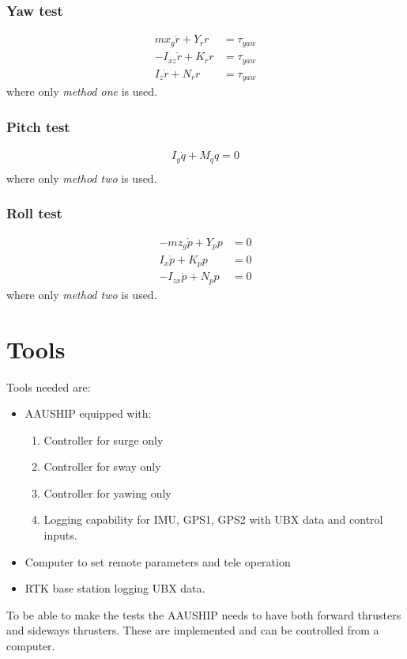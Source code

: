 \subsubsection{Yaw test}
\begin{align}
mx_g\dot r + Y_rr &= \tau_{yaw}\\
-I_{xz}\dot r + K_rr &= \tau_{yaw}\\
I_z\dot r + N_rr &= \tau_{yaw}
\end{align}
where only \textit{method one} is used.

\subsubsection{Pitch test}
\begin{align}
I_y\dot q + M_qq = 0\\
\end{align}
where only \textit{method two} is used.

\subsubsection{Roll test}
\begin{align}
-mz_g\dot p + Y_pp &= 0\\
I_x\dot p + K_pp &= 0\\
-I_{zx}\dot p + N_pp &= 0
\end{align}
where only \textit{method two} is used.

\section{Tools}
Tools needed are:
\begin{itemize}
	\item AAUSHIP equipped with:
		\begin{enumerate}
			\item Controller for surge only
			\item Controller for sway only
			\item Controller for yawing only
			\item Logging capability for \ac{IMU}, GPS1, GPS2 with UBX data
				and control inputs.
		\end{enumerate}
	\item Computer to set remote parameters and tele operation
	\item RTK base station logging UBX data.
\end{itemize}
To be able to make the tests the AAUSHIP needs to have both forward thrusters and sideways thrusters. These are implemented and can be controlled from a computer.

